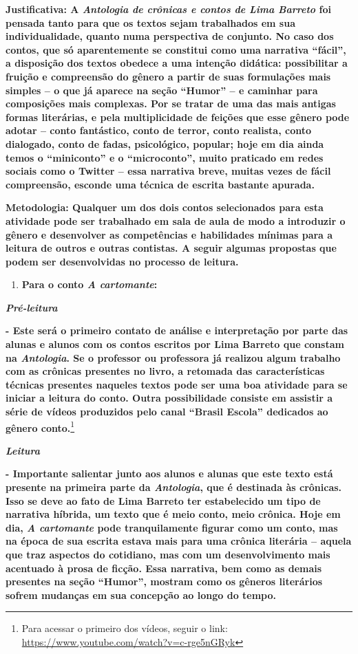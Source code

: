 \textbf{Justificativa: A \emph{Antologia de crônicas e contos de Lima
Barreto} foi pensada tanto para que os textos sejam trabalhados em sua
individualidade, quanto numa perspectiva de conjunto. No caso dos
contos, que só aparentemente se constitui como uma narrativa ``fácil'',
a disposição dos textos obedece a uma intenção didática: possibilitar a
fruição e compreensão do gênero a partir de suas formulações mais
simples -- o que já aparece na seção ``Humor'' -- e caminhar para
composições mais complexas. Por se tratar de uma das mais antigas formas
literárias, e pela multiplicidade de feições que esse gênero pode adotar
-- conto fantástico, conto de terror, conto realista, conto dialogado,
conto de fadas, psicológico, popular; hoje em dia ainda temos o
``miniconto'' e o ``microconto'', muito praticado em redes sociais como
o Twitter -- essa narrativa breve, muitas vezes de fácil compreensão,
esconde uma técnica de escrita bastante apurada. }

\textbf{Metodologia: Qualquer um dos dois contos selecionados para esta
atividade pode ser trabalhado em sala de aula de modo a introduzir o
gênero e desenvolver as competências e habilidades mínimas para a
leitura de outros e outras contistas. A seguir algumas propostas que
podem ser desenvolvidas no processo de leitura. }

\begin{enumerate}
\def\labelenumi{\arabic{enumi})}
\item
  \textbf{Para o conto \emph{A cartomante}:}
\end{enumerate}

\emph{\textbf{Pré-leitura}}

\textbf{- Este será o primeiro contato de análise e interpretação por
parte das alunas e alunos com os contos escritos por Lima Barreto que
constam na \emph{Antologia}. Se o professor ou professora já realizou
algum trabalho com as crônicas presentes no livro, a retomada das
características técnicas presentes naqueles textos pode ser uma boa
atividade para se iniciar a leitura do conto. Outra possibilidade
consiste em assistir a série de vídeos produzidos pelo canal ``Brasil
Escola'' dedicados ao gênero conto.}\footnote{Para acessar o primeiro
  dos vídeos, seguir o link:
  \url{https://www.youtube.com/watch?v=c-rge5nGRyk}}

\emph{\textbf{Leitura}}

\textbf{- Importante salientar junto aos alunos e alunas que este texto
está presente na primeira parte da \emph{Antologia}, que é destinada às
crônicas. Isso se deve ao fato de Lima Barreto ter estabelecido um tipo
de narrativa híbrida, um texto que é meio conto, meio crônica. Hoje em
dia, \emph{A cartomante} pode tranquilamente figurar como um conto, mas
na época de sua escrita estava mais para uma crônica literária -- aquela
que traz aspectos do cotidiano, mas com um desenvolvimento mais
acentuado à prosa de ficção. Essa narrativa, bem como as demais
presentes na seção ``Humor'', mostram como os gêneros literários sofrem
mudanças em sua concepção ao longo do tempo.}


